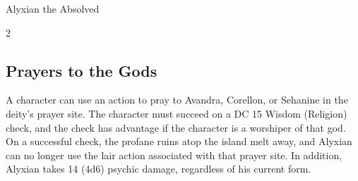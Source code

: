 \documentclass[10pt,a4paper,twoside,bg=print,twocolumn,openany,nodeprecatedcode]{dndbook}
\begin{document}
\begin{DndMonster}[float*=b,width=\textwidth + 8pt]{Alyxian the Absolved}
\begin{multicols}{2}
\subsection{Prayers to the Gods}
A character can use an action to pray to Avandra, Corellon, or Sehanine in the deity's prayer site. The character must succeed on a DC 15 Wisdom (Religion) check, and the check has advantage if the character is a worshiper of that god. On a successful check, the profane ruins atop the island melt away, and Alyxian can no longer use the lair action associated with that prayer site. In addition, Alyxian takes 14 (4d6) psychic damage, regardless of his current form.

\end{multicols}
\end{DndMonster}
\end{document}
